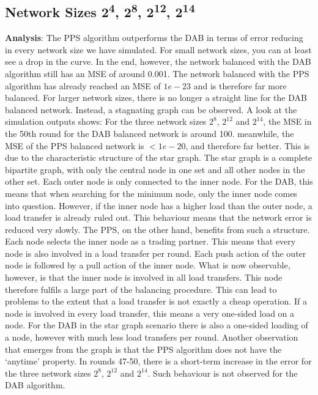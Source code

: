 \subsection{Network Sizes 2\textsuperscript{4}, 2\textsuperscript{8}, 2\textsuperscript{12}, 2\textsuperscript{14}}
\textbf{Analysis}: The PPS algorithm outperforms the DAB in terms of error reducing in every network size we have simulated. For small network sizes, you can at least see a drop in the curve. In the end, however, the network balanced with the DAB algorithm still has an MSE of around 0.001. The network balanced with the PPS algorithm has already reached an MSE of $1e-23$ and is therefore far more balanced. For larger network sizes, there is no longer a straight line for the DAB balanced network. Instead, a stagnating graph can be observed. A look at the simulation outputs shows: For the three network sizes $2^{8}$, $2^{12}$ and $2^{14}$, the MSE in the 50th round for the DAB balanced network is around 100. meanwhile, the MSE of the PPS balanced network is $<1e-20$, and therefore far better. This is due to the characteristic structure of the star graph. The star graph is a complete bipartite graph, with only the central node in one set and all other nodes in the other set. Each outer node is only connected to the inner node. For the DAB, this means that when searching for the minimum node, only the inner node comes into question. However, if the inner node has a higher load than the outer node, a load transfer is already ruled out. This behaviour means that the network error is reduced very slowly. The PPS, on the other hand, benefits from such a structure. Each node selects the inner node as a trading partner. This means that every node is also involved in a load transfer per round. Each push action of the outer node is followed by a pull action of the inner node. What is now observable, however, is that the inner node is involved in all load transfers. This node therefore fulfils a large part of the balancing procedure. This can lead to problems to the extent that a load transfer is not exactly a cheap operation. If a node is involved in every load transfer, this means a very one-sided load on a node. For the DAB in the star graph scenario there is also a one-sided loading of a node, however with much less load transfers per round. Another observation that emerges from the graph is that the PPS algorithm does not have the ‘anytime’ property. In rounds 47-50, there is a short-term increase in the error for the three network sizes $2^{8}$, $2^{12}$ and $2^{14}$. Such behaviour is not observed for the DAB algorithm.\\

